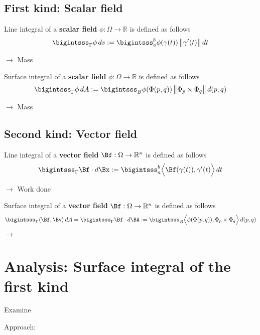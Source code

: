 \documentclass[12pt]{article}
\begin{document}
\subsection{First kind: Scalar field}
\begin{recallboxed}
	\label{recall:scalar}
	Line integral of a 
	\textbf{scalar field} $\phi: \Omega \to \mathbb{R}$ is defined as follows
	\begin{align}
		\bigintsss_{\Gamma} \phi \, ds 
		:= \bigintsss_{a}^{b} \phi(\gamma(t))  \, \big\| \gamma'(t) \big\| \, dt
	\end{align}
\end{recallboxed}
$\rightarrow$ Mass
\begin{recallboxed}
	\label{recall:scalarsurface}
	Surface integral of a 
	\textbf{scalar field} $\phi: \Omega \to \mathbb{R}$ is defined as follows
	\begin{align}
		\bigintsss_{\Gamma} \phi \, dA 
		:= \bigintsss_{B} \phi(\Phi(p,q)) \, \big\| \Phi_p \times \Phi_q \big\| \, d(p,q)
	\end{align}
\end{recallboxed}
$\rightarrow$ Mass
\subsection{Second kind: Vector field}
\begin{recallboxed}
	\label{recall:vectorsurface}
	Line integral of a \textbf{vector field} $\Bf: \Omega \to \mathbb{R}^{n}$ is defined as follows
	\begin{align}
		\bigintsss_{\Gamma} \Bf \cdot d\Bx 
		:= \bigintsss_{a}^{b}
		\Big\langle \Bf(\gamma(t)), \gamma'(t) \Big\rangle \, dt
	\end{align}
\end{recallboxed}
$\rightarrow$ Work done
\begin{recallboxed}
	\label{recall:vector}
	Surface integral of a \textbf{vector field} $\Bf: \Omega \to \mathbb{R}^{n}$ is defined as follows
	\begin{align}
		\bigintsss_{\Gamma} \langle \Bf, \Bv \rangle \, dA 
		= \bigintsss_{\Gamma} \Bf \cdot d\BA
		:= \bigintsss_{B}
		\Big\langle 
		\phi(\Phi(p,q)), \Phi_p \times \Phi_q
		\Big\rangle
		\, d(p,q)
	\end{align}
\end{recallboxed}
$\rightarrow$ 
\clearpage
\section{Analysis: Surface integral of the first kind}
\begin{exampleboxed}
	Examine
\end{exampleboxed}
Approach:
\end{document}
